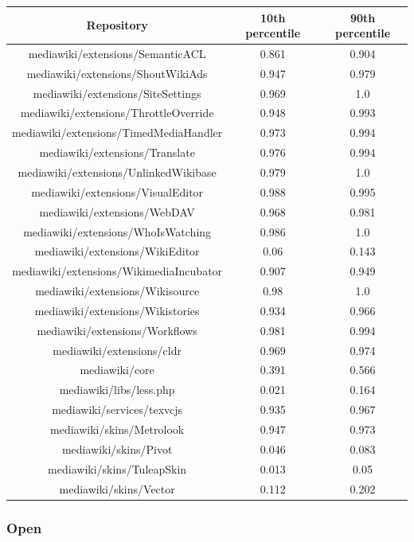 \begin{table}[H]
    \centering
    \begin{tabular}{@{}c c c@{}} 
    \hline
    \textbf{Repository} & \textbf{10th percentile} & \textbf{90th percentile} \\
    \hline
mediawiki/extensions/SemanticACL & 0.861 & 0.904 \\
mediawiki/extensions/ShoutWikiAds & 0.947 & 0.979 \\
mediawiki/extensions/SiteSettings & 0.969 & 1.0 \\
mediawiki/extensions/ThrottleOverride & 0.948 & 0.993 \\
mediawiki/extensions/TimedMediaHandler & 0.973 & 0.994 \\
mediawiki/extensions/Translate & 0.976 & 0.994 \\
mediawiki/extensions/UnlinkedWikibase & 0.979 & 1.0 \\
mediawiki/extensions/VisualEditor & 0.988 & 0.995 \\
mediawiki/extensions/WebDAV & 0.968 & 0.981 \\
mediawiki/extensions/WhoIsWatching & 0.986 & 1.0 \\
mediawiki/extensions/WikiEditor & 0.06 & 0.143 \\
mediawiki/extensions/WikimediaIncubator & 0.907 & 0.949 \\
mediawiki/extensions/Wikisource & 0.98 & 1.0 \\
mediawiki/extensions/Wikistories & 0.934 & 0.966 \\
mediawiki/extensions/Workflows & 0.981 & 0.994 \\
mediawiki/extensions/cldr & 0.969 & 0.974 \\
mediawiki/core & 0.391 & 0.566 \\
mediawiki/libs/less.php & 0.021 & 0.164 \\
mediawiki/services/texvcjs & 0.935 & 0.967 \\
mediawiki/skins/Metrolook & 0.947 & 0.973 \\
mediawiki/skins/Pivot & 0.046 & 0.083 \\
mediawiki/skins/TuleapSkin & 0.013 & 0.05 \\
mediawiki/skins/Vector & 0.112 & 0.202 \\
    \hline
\end{tabular}
    \label{table:accuracy-score-merged-voted-appendix-c-part-4}
\end{table}

\subsubsection{Open}

